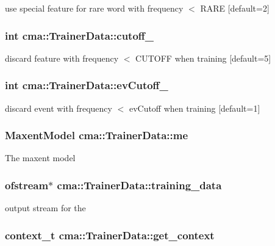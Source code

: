 use special feature for rare word with frequency $<$ RARE [default=2] 
\subsubsection{\setlength{\rightskip}{0pt plus 5cm}int {\bf cma::TrainerData::cutoff\_\-}}\label{classcma_1_1TrainerData_23c70e451c8ba9cf53e2eccec8fc421d}


discard feature with frequency $<$ CUTOFF when training [default=5] 
\subsubsection{\setlength{\rightskip}{0pt plus 5cm}int {\bf cma::TrainerData::evCutoff\_\-}}\label{classcma_1_1TrainerData_22eca27d2b88fc89251ed74fa9b1a255}


discard event with frequency $<$ evCutoff when training [default=1] 
\subsubsection{\setlength{\rightskip}{0pt plus 5cm}MaxentModel {\bf cma::TrainerData::me}}\label{classcma_1_1TrainerData_eebdd898115e74ed985c5b776bbb3074}


The maxent model 
\subsubsection{\setlength{\rightskip}{0pt plus 5cm}ofstream$\ast$ {\bf cma::TrainerData::training\_\-data}}\label{classcma_1_1TrainerData_beca151a5af14873ecd25be4ff926d24}


output stream for the 
\subsubsection{\setlength{\rightskip}{0pt plus 5cm}context\_\-t {\bf cma::TrainerData::get\_\-context}}\label{classcma_1_1TrainerData_6a4496484d04a90c61f201011536d8c2}


